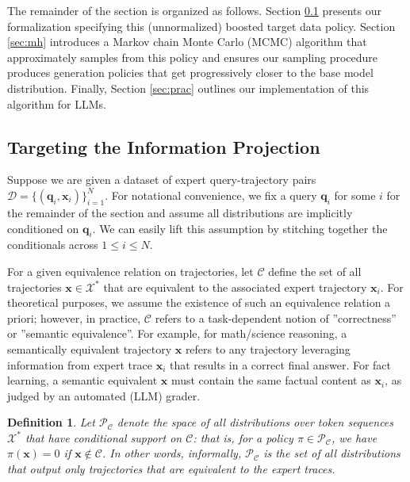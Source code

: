 \documentclass{article}
\newtheorem{definition}{Definition}
\begin{document}
The remainder of the section is organized as follows. Section \ref{sec:min_kl} presents our formalization specifying this (unnormalized) boosted target data policy. Section \ref{sec:mh} introduces a Markov chain Monte Carlo (MCMC) algorithm that approximately samples from this policy and  ensures our sampling procedure produces generation policies that get progressively closer to the base model distribution. Finally, Section \ref{sec:prac} outlines our implementation of this algorithm for LLMs.

\subsection{Targeting the Information Projection}\label{sec:min_kl}

Suppose we are given a dataset of expert query-trajectory pairs  $\mathcal{D} = \{(\mathbf{q}_{i}, \mathbf{x}_{i})\}_{i=1}^N$. For notational convenience, we fix a query $\mathbf{q}_i$ for some $i$ for the remainder of the section and assume all distributions are implicitly conditioned on $\mathbf{q}_{i}$. We can easily lift this assumption by stitching together the conditionals across $1 \leq i \leq N$.


For a given equivalence relation on trajectories, let $\mathcal{C}$ define the set of all trajectories $\mathbf{x}\in \mathcal{X}^*$ that are equivalent to the associated expert trajectory $\mathbf{x}_{i}$. For theoretical purposes, we assume the existence of such an equivalence relation a priori; however, in practice, $\mathcal{C}$ refers to a task-dependent notion of ''correctness'' or ''semantic equivalence''. For example, for math/science reasoning, a semantically equivalent trajectory $\mathbf{x}$ refers to any trajectory leveraging information from expert trace $\mathbf{x}_{i}$ that results in a correct final answer. For fact learning, a semantic equivalent $\mathbf{x}$ must contain the same factual content as $\mathbf{x}_{i}$, as judged by an automated (LLM) grader.


 \begin{definition}
    {\rm Let $\mathcal{P}_{\mathcal{C}}$ denote the space of all distributions over token sequences $\mathcal{X}^*$ that have conditional support on $\mathcal{C}$: that is, for a policy $\pi \in \mathcal{P}_{\mathcal{C}}$, we have $\pi(\mathbf{x}) = 0$ if $ \mathbf{x} \notin \mathcal{C}$. In other words, informally, $\mathcal{P}_{\mathcal{C}}$ is the set of all distributions that output only trajectories that are equivalent to the expert traces. }
\end{definition}
\end{document}
